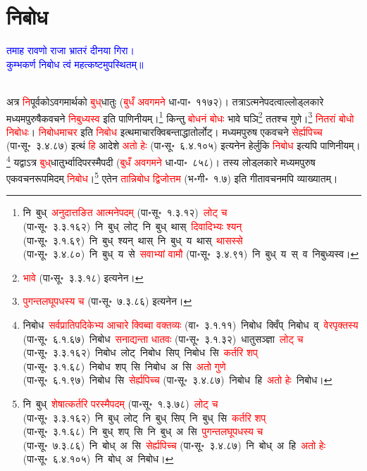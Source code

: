 \section[निबोध]{निबोध}
\centering\textcolor{blue}{तमाह रावणो राजा भ्रातरं दीनया गिरा।\nopagebreak\\
कुम्भकर्ण निबोध त्वं महत्कष्टमुपस्थितम्॥}\nopagebreak\\
\\
\fontsize{14}{21}\selectfont\begin{sloppypar}\justifying\noindent\hspace{10mm} अत्र \textcolor{red}{नि}\-पूर्वकोऽवगमार्थको \textcolor{red}{बुध्‌}\-धातुः (\textcolor{red}{बुधँ अवगमने} धा॰पा॰~११७२)। तत्राऽत्मनेपदत्वाल्लोड्\-लकारे मध्यम\-पुरुषैक\-वचने \textcolor{red}{निबुध्यस्व} इति पाणिनीयम्।\footnote{नि~बुध्~\arrow \textcolor{red}{अनुदात्तङित आत्मनेपदम्} (पा॰सू॰~१.३.१२)~\arrow \textcolor{red}{लोट् च} (पा॰सू॰~३.३.१६२)~\arrow नि~बुध्~लोट्~\arrow नि~बुध्~थास्~\arrow \textcolor{red}{दिवादिभ्यः श्यन्} (पा॰सू॰~३.१.६९)~\arrow नि~बुध्~श्यन्~थास्~\arrow नि~बुध्~य~थास्~\arrow \textcolor{red}{थासस्से} (पा॰सू॰~३.४.८०)~\arrow नि~बुध्~य~से~\arrow \textcolor{red}{सवाभ्यां वामौ} (पा॰सू॰~३.४.९१)~\arrow नि~बुध्~य~स्~व~\arrow निबुध्यस्व।} किन्तु \textcolor{red}{बोधनं बोधः} भावे घञि\footnote{\textcolor{red}{भावे} (पा॰सू॰~३.३.१८) इत्यनेन।} ततश्च गुणे।\footnote{\textcolor{red}{पुगन्त\-लघूपधस्य च} (पा॰सू॰~७.३.८६) इत्यनेन।} \textcolor{red}{नितरां बोधो निबोधः}। \textcolor{red}{निबोधमाचर} इति \textcolor{red}{निबोध} इत्थमाचार\-क्विबन्ताद्धातोर्लोट्। मध्यम\-पुरुष एकवचने \textcolor{red}{सेर्ह्यपिच्च} (पा॰सू॰~३.४.८७) इत्थं \textcolor{red}{हि} आदेशे \textcolor{red}{अतो हेः} (पा॰सू॰~६.४.१०५) इत्यनेन हेर्लुकि \textcolor{red}{निबोध} इत्यपि पाणिनीयम्।\footnote{निबोध~\arrow \textcolor{red}{सर्वप्राति\-पदिकेभ्य आचारे क्विब्वा वक्तव्यः} (वा॰~३.१.११)~\arrow निबोध~क्विँप्~\arrow निबोध~व्~\arrow \textcolor{red}{वेरपृक्तस्य} (पा॰सू॰~६.१.६७)~\arrow निबोध~\arrow \textcolor{red}{सनाद्यन्ता धातवः} (पा॰सू॰~३.१.३२)~\arrow धातुसञ्ज्ञा~\arrow \textcolor{red}{लोट् च} (पा॰सू॰~३.३.१६२)~\arrow निबोध~लोट्~\arrow निबोध~सिप्~\arrow निबोध~सि~\arrow \textcolor{red}{कर्तरि शप्} (पा॰सू॰~३.१.६८)~\arrow निबोध~शप्~सि~\arrow निबोध~अ~सि~\arrow \textcolor{red}{अतो गुणे} (पा॰सू॰~६.१.९७)~\arrow निबोध~सि~\arrow \textcolor{red}{सेर्ह्यपिच्च} (पा॰सू॰~३.४.८७)~\arrow निबोध~हि~\arrow \textcolor{red}{अतो हेः}~\arrow निबोध।} यद्वाऽत्र \textcolor{red}{बुध्‌}\-धातुर्भ्वादि\-परस्मैपदी (\textcolor{red}{बुधँ अवगमने} धा॰पा॰~८५८)। तस्य लोड्लकारे मध्यमपुरुष एकवचन\-रूपमिदम् \textcolor{red}{निबोध}।\footnote{नि~बुध्~\arrow \textcolor{red}{शेषात्कर्तरि परस्मैपदम्} (पा॰सू॰~१.३.७८)~\arrow \textcolor{red}{लोट् च} (पा॰सू॰~३.३.१६२)~\arrow नि~बुध्~लोट्~\arrow नि~बुध्~सिप्~\arrow नि~बुध्~सि~\arrow \textcolor{red}{कर्तरि शप्} (पा॰सू॰~३.१.६८)~\arrow नि~बुध्~शप्~सि~\arrow नि~बुध्~अ~सि~\arrow \textcolor{red}{पुगन्त\-लघूपधस्य च} (पा॰सू॰~७.३.८६)~\arrow नि~बोध्~अ~सि~\arrow \textcolor{red}{सेर्ह्यपिच्च} (पा॰सू॰~३.४.८७)~\arrow नि~बोध्~अ~हि~\arrow \textcolor{red}{अतो हेः} (पा॰सू॰~६.४.१०५)~\arrow नि~बोध्~अ~\arrow निबोध।} एतेन \textcolor{red}{तान्निबोध द्विजोत्तम} (भ॰गी॰~१.७) इति गीता\-वचनमपि व्याख्यातम्।\end{sloppypar}
